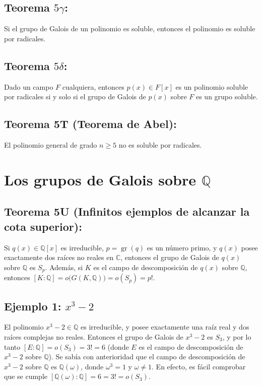 \documentclass{article}
\DeclareMathOperator{\gr}{gr}
\begin{document}
\subsection*{\color{red} Teorema $5\gamma$:}

Si el grupo de Galois de un polinomio es soluble, entonces el polinomio es soluble por radicales.

\subsection*{\color{red} Teorema $5\delta$:}

Dado un campo $F$ cualquiera, entonces $p(x)\in F[x]$ es un polinomio soluble por radicales si y solo si el grupo de Galois de $p(x)$ sobre $F$ es un grupo soluble.

\subsection*{\color{red} Teorema 5T (Teorema de Abel):}

El polinomio general de grado $n\geq 5$ no es soluble por radicales.

\newpage
\section*{Los grupos de Galois sobre $\mathbb{Q}$}

\subsection*{\color{red} Teorema 5U (Infinitos ejemplos de alcanzar la cota superior):}

Si $q(x)\in\mathbb{Q}[x]$ es irreducible, $p=\gr(q)$ es un número primo, y $q(x)$ posee exactamente dos raíces no reales en $\mathbb{C}$, entonces el grupo de Galois de $q(x)$ sobre $\mathbb{Q}$ es $S_p$. Además, si $K$ es el campo de descomposición de $q(x)$ sobre $\mathbb{Q}$, entonces $[K:\mathbb{Q}]=o\big(G(K,\mathbb{Q})\big)=o(S_p)=p!$.

\subsection*{\color{teal} Ejemplo 1: $x^3-2$}

El polinomio $x^3-2\in\mathbb{Q}$ es irreducible, y posee exactamente una raíz real y dos raíces complejas no reales. Entonces el grupo de Galois de $x^3-2$ es $S_3$, y por lo tanto $[E:\mathbb{Q}]=o(S_3)=3!=6$ (donde $E$ es el campo de descomposición de $x^3-2$ sobre $\mathbb{Q}$). Se sabía con anterioridad que el campo de descomposición de $x^3-2$ sobre $\mathbb{Q}$ es $\mathbb{Q}(\omega)$, donde $\omega^3=1$ y $\omega\neq 1$. En efecto, es fácil comprobar que se cumple $[\mathbb{Q}(\omega):\mathbb{Q}]=6=3!=o(S_3)$.
\end{document}
